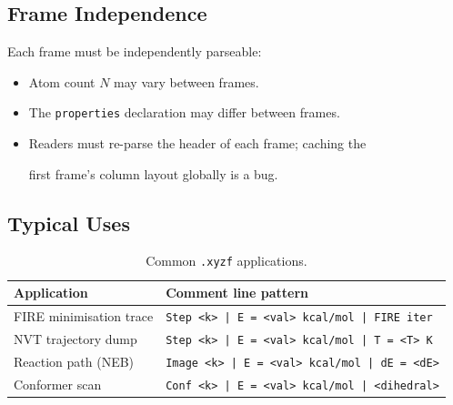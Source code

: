 \documentclass[12pt, a4paper, oneside]{article}
\begin{document}
\subsection{Frame Independence}


Each frame must be independently parseable:


\begin{itemize}

  \item Atom count $N$ may vary between frames.

  \item The \texttt{properties} declaration may differ between frames.

  \item Readers must re-parse the header of each frame; caching the

        first frame's column layout globally is a bug.

\end{itemize}


\subsection{Typical Uses}


\begin{table}[htbp]

  \centering

  \caption{Common \texttt{.xyzf} applications.}

  \label{tab:xyzf_uses}

  \begin{tabular}{lp{8cm}}

    \toprule

    Application & Comment line pattern \\

    \midrule

    FIRE minimisation trace  & \texttt{Step <k> | E = <val> kcal/mol | FIRE iter} \\

    NVT trajectory dump      & \texttt{Step <k> | E = <val> kcal/mol | T = <T> K} \\

    Reaction path (NEB)      & \texttt{Image <k> | E = <val> kcal/mol | dE = <dE>} \\

    Conformer scan           & \texttt{Conf <k> | E = <val> kcal/mol | <dihedral>} \\

    \bottomrule

  \end{tabular}

\end{table}
\end{document}
